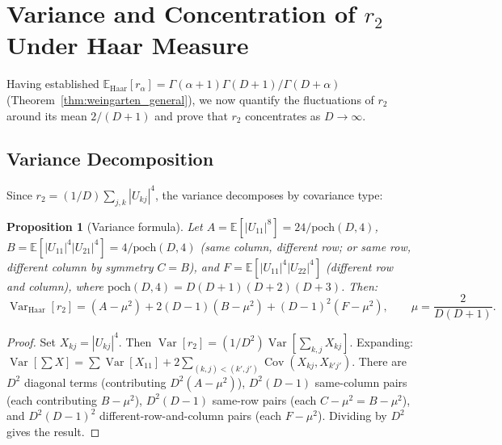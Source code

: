 \documentclass[12pt,a4paper]{article}
\newtheorem{proposition}[theorem]{Proposition}
\begin{document}
\section{Variance and Concentration of $r_2$ Under Haar Measure}
\label{sec:variance_conc}

Having established $\mathbb{E}_{\mathrm{Haar}}[r_\alpha]=\Gamma(\alpha+1)\Gamma(D+1)/\Gamma(D+\alpha)$
(Theorem~\ref{thm:weingarten_general}), we now quantify the fluctuations of $r_2$
around its mean $2/(D+1)$ and prove that $r_2$ concentrates as $D\to\infty$.

\subsection{Variance Decomposition}
\label{sec:var_decomp}

Since $r_2=(1/D)\sum_{j,k}|U_{kj}|^4$, the variance decomposes by covariance type:

\begin{proposition}[Variance formula]
\label{prop:var_formula}
Let $A=\mathbb{E}[|U_{11}|^8]=24/\mathrm{poch}(D,4)$,
$B=\mathbb{E}[|U_{11}|^4|U_{21}|^4]=4/\mathrm{poch}(D,4)$
(same column, different row; or same row, different column by symmetry $C=B$),
and $F=\mathbb{E}[|U_{11}|^4|U_{22}|^4]$ (different row \emph{and} column),
where $\mathrm{poch}(D,4)=D(D+1)(D+2)(D+3)$.
Then:
\[
  \operatorname{Var}_{\mathrm{Haar}}[r_2]
  = (A-\mu^2) + 2(D-1)(B-\mu^2) + (D-1)^2(F-\mu^2),
  \qquad \mu = \frac{2}{D(D+1)}.
\]
\end{proposition}

\begin{proof}
Set $X_{kj}=|U_{kj}|^4$. Then $\operatorname{Var}[r_2]=(1/D^2)\operatorname{Var}[\sum_{k,j}X_{kj}]$.
Expanding: $\operatorname{Var}[\sum X]=\sum\operatorname{Var}[X_{11}]+2\sum_{(k,j)<(k',j')}\operatorname{Cov}(X_{kj},X_{k'j'})$.
There are $D^2$ diagonal terms (contributing $D^2(A-\mu^2)$), $D^2(D-1)$ same-column pairs
(each contributing $B-\mu^2$), $D^2(D-1)$ same-row pairs (each $C-\mu^2=B-\mu^2$),
and $D^2(D-1)^2$ different-row-and-column pairs (each $F-\mu^2$).
Dividing by $D^2$ gives the result.
\end{proof}
\end{document}
